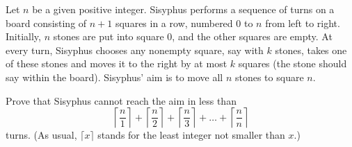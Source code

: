 Let $n$ be a given positive integer. Sisyphus performs a sequence of turns on a board consisting of $n + 1$ squares in a row, numbered $0$ to $n$ from left to right. Initially, $n$ stones are put into square $0$,  and the other squares are empty. At every turn, Sisyphus chooses any nonempty square, say with $k$ stones, takes one of these stones and moves it to the right by at most $k$ squares (the stone should say within the board). Sisyphus' aim is to move all $n$ stones to square $n$.

Prove that Sisyphus cannot reach the aim in less than\[ \left \lceil \frac{n}{1} \right \rceil + \left \lceil \frac{n}{2} \right \rceil + \left \lceil \frac{n}{3} \right \rceil + \dots + \left \lceil \frac{n}{n} \right \rceil \]turns. (As usual, $\lceil x \rceil$ stands for the least integer not smaller than $x$.)